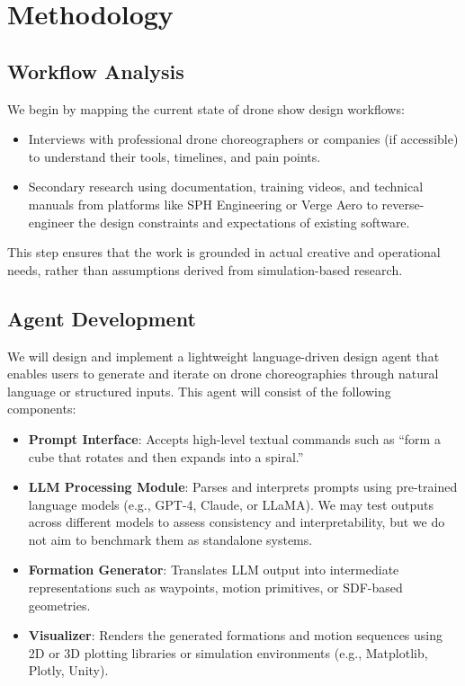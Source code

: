 
\section{Methodology}

\subsection{Workflow Analysis}
We begin by mapping the current state of drone show design workflows:
\begin{itemize}
  \item Interviews with professional drone choreographers or companies (if accessible) to understand their tools, timelines, and pain points.
  \item Secondary research using documentation, training videos, and technical manuals from platforms like SPH Engineering or Verge Aero to reverse-engineer the design constraints and expectations of existing software.
\end{itemize}

This step ensures that the work is grounded in actual creative and operational needs, rather than assumptions derived from simulation-based research.

\subsection{Agent Development}
We will design and implement a lightweight language-driven design agent that enables users to generate and iterate on drone choreographies through natural language or structured inputs. This agent will consist of the following components:

\begin{itemize}
  \item \textbf{Prompt Interface}: Accepts high-level textual commands such as “form a cube that rotates and then expands into a spiral.”
  \item \textbf{LLM Processing Module}: Parses and interprets prompts using pre-trained language models (e.g., GPT-4, Claude, or LLaMA). We may test outputs across different models to assess consistency and interpretability, but we do not aim to benchmark them as standalone systems.
  \item \textbf{Formation Generator}: Translates LLM output into intermediate representations such as waypoints, motion primitives, or SDF-based geometries.
  \item \textbf{Visualizer}: Renders the generated formations and motion sequences using 2D or 3D plotting libraries or simulation environments (e.g., Matplotlib, Plotly, Unity).
\end{itemize}

